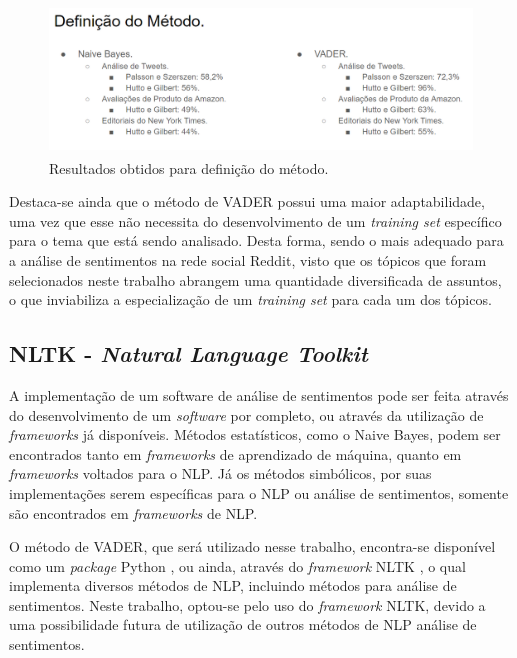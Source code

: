 \begin{figure}[htbp]
\centering
\includegraphics[height=150px]{imagens/definicao.png}
\caption{Resultados obtidos para definição do método.}
\label{fig:definicao}
\end{figure}

Destaca-se ainda que o método de \ac{VADER} possui uma maior
adaptabilidade, uma vez que esse não necessita do desenvolvimento de um
\textit{training set} específico para o tema que está sendo analisado.
Desta forma, sendo o mais adequado para a análise de sentimentos na rede social
Reddit, visto que os tópicos que foram selecionados neste trabalho abrangem uma
quantidade diversificada de assuntos, o que inviabiliza a especialização de um
\textit{training set} para cada um dos tópicos.


\subsection{NLTK - \textit{Natural Language Toolkit}}

A implementação de um software de análise de sentimentos pode ser feita através
do desenvolvimento de um \textit{software} por completo, ou através da
utilização de \textit{frameworks} já disponíveis.
Métodos estatísticos, como o Naive Bayes, podem ser encontrados tanto em
\textit{frameworks} de aprendizado de máquina, quanto em \textit{frameworks}
voltados para o \ac{NLP}.
Já os métodos simbólicos, por suas implementações serem específicas para o
\ac{NLP} ou análise de sentimentos, somente são encontrados em
\textit{frameworks} de \ac{NLP}.

O método de \ac{VADER}, que será utilizado nesse trabalho, encontra-se
disponível como um \textit{package} Python \cite{Rossum:1995:PRM:869369}, ou
ainda, através do \textit{framework} \ac{NLTK}
\cite{Loper:2002:NNL:1118108.1118117}, o qual implementa diversos métodos de \ac{NLP}, incluindo métodos para análise de sentimentos. Neste trabalho,
optou-se pelo uso do \textit{framework} \ac{NLTK}, devido a uma possibilidade
futura de utilização de outros métodos de \ac{NLP} análise de sentimentos.

